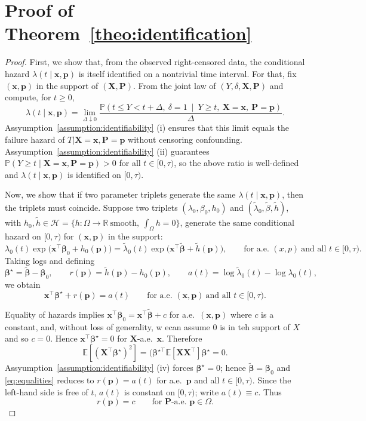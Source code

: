 \documentclass[11pt]{article}
\begin{document}
		\section{Proof of Theorem~\ref{theo:identification}}\label{appendix:identification}
	\begin{proof}
	First, we show that, from the observed right-censored data, the conditional hazard \(\lambda(t\mid \bm x,\bm p)\) is itself identified on a nontrivial time interval. For that, fix \((\bm x,\bm p)\) in the support of \((\bm X,\bm P)\). From the joint law of \((Y,\delta,\bm X,\bm P)\) and compute, for \(t\ge 0\),
		\[
		\lambda(t\mid \bm x,\bm p)
		=
		\lim_{\Delta \downarrow 0}
		\frac{\mathbb P\!\left(t\le Y<t+\Delta,\ \delta=1\ \middle|\ Y\ge t,\ \bm X=\bm x,\ \bm P=\bm p\right)}{\Delta }.
		\] 
	Assyumption~\ref{assumption:identifiability} (i) ensures that this limit equals the failure hazard of \(T|\bm X = \bm x, \bm P=\bm p\) without censoring confounding. Assyumption~\ref{assumption:identifiability} (ii) guarantees \(\mathbb P(Y\ge t\mid \bm X=\bm x,\bm P=\bm p)>0\) for all \(t\in[0,\tau)\), so the above ratio is well-defined and \(\lambda(t\mid \bm x,\bm p)\) is identified on \([0,\tau)\).
	
	Now, we show that if two parameter triplets generate the same 
	$\lambda(t\mid \bm x,\bm p)$, then the triplets must coincide. 
	Suppose two triplets $(\lambda_0,\beta_0,h_0)$ and 
	$(\tilde\lambda_0,\tilde\beta,\tilde h)$, with 
	$h_0,\tilde h\in\mathcal H=\{h:\Omega\to\mathbb R\ \text{smooth},\ 
	\int_\Omega h=0\}$, generate the same conditional hazard on $[0,\tau)$ 
	for $(\bm x,\bm p)$ in the support:
	\[
	\lambda_0(t)\exp\!\big(\bm x^\top\bm \beta_0+h_0(\bm p)\big)
	=\tilde\lambda_0(t)\exp\!\big(\bm x^\top\tilde{\bm \beta}+\tilde h(\bm p)\big),
	\qquad \text{for a.e.\ }(x,p)\ \text{and all }t\in[0,\tau).
	\]
	Taking logs and defining
	\[
	\bm \beta^\star=\tilde{\bm \beta}-\bm \beta_0,\qquad
	r(\bm p)=\tilde h(\bm p)-h_0(\bm p),\qquad
	a(t)=\log\tilde\lambda_0(t)-\log\lambda_0(t),
	\]
	we obtain
	\begin{equation}\label{eq:equalities}
		\bm x^\top\bm \beta^\star + r(\bm p) = a(t)
		\qquad\text{for a.e.\ }(\bm x,\bm p)\ \text{and all }t\in[0,\tau).
	\end{equation}

	Equality of hazards implies 
	$\bm x^\top\bm \beta_0=\bm x^\top\tilde{\bm \beta} + c$ for a.e.\ $(\bm x,\bm p)$ where $c$ is a constant, and, without loss of generality, w ecan assume $0$ is in teh support of $X$ and so $c=0$. Hence 
	$\bm x^\top\bm \beta^\star=0$ for $\bm X$-a.e.\ $\bm x$. Therefore
	\[
	\mathbb E\!\left[(\bm X^\top\bm \beta^\star)^2\right]
	=(\bm \beta^{\star\top} \mathbb E[\bm X\bm X^\top]\bm \beta^\star
	=0.
	\]
	Assyumption~\ref{assumption:identifiability} (iv) forces $\bm \beta^\star= 0$; hence $\tilde{\bm \beta}=\bm \beta_0$ and \eqref{eq:equalities} reduces to 
	$r(\bm p)=a(t)$ for a.e.\ $\bm p$ and all $t\in[0,\tau)$. 
	Since the left-hand side is free of $t$, $a(t)$ is constant on 
	$[0,\tau)$; write $a(t)\equiv c$. Thus
	\begin{equation}\label{eq:rConstant}
		r(\bm p)=c\qquad\text{for $\bm  P$-a.e.\ }\bm p\in\Omega.
	\end{equation}
	

\end{proof}
\end{document}
